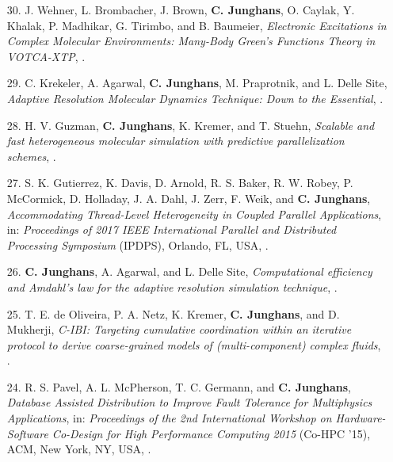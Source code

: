 \documentclass{article}
\begin{document}
\begin{enumerate}
\item[30.] J. Wehner, L. Brombacher, J. Brown, \textbf{C. Junghans}, O. Caylak, Y. Khalak, P. Madhikar, G. Tirimbo, and B. Baumeier,
  \textit{Electronic Excitations in Complex Molecular Environments: Many-Body Green's Functions Theory in VOTCA-XTP},
  .

\item[29.] C. Krekeler, A. Agarwal, \textbf{C. Junghans}, M. Praprotnik, and L. Delle Site,
  \textit{Adaptive Resolution Molecular Dynamics Technique: Down to the Essential},
  .

\item[28.] H. V. Guzman, \textbf{C. Junghans}, K. Kremer, and T. Stuehn,
  \textit{Scalable and fast heterogeneous molecular simulation with predictive parallelization schemes},
  .

\item[27.] S. K. Gutierrez, K. Davis, D. Arnold, R. S. Baker, R. W. Robey, P. McCormick, D. Holladay, J. A. Dahl, J. Zerr, F. Weik, and \textbf{C. Junghans},
  \textit{Accommodating Thread-Level Heterogeneity in Coupled Parallel Applications},
  in: \textit{Proceedings of 2017 IEEE International Parallel and Distributed Processing Symposium} (IPDPS),
  Orlando, FL, USA, .

\item[26.] \textbf{C. Junghans}, A. Agarwal, and L. Delle Site,
  \textit{Computational efficiency and Amdahl’s law for the adaptive resolution simulation technique},
  .

\item[25.] T. E. de Oliveira, P. A. Netz, K. Kremer, \textbf{C. Junghans}, and D. Mukherji,
  \textit{C-IBI: Targeting cumulative coordination within an iterative protocol to derive coarse-grained models of (multi-component) complex fluids},
  .

\item[24.] R. S. Pavel, A. L. McPherson, T. C. Germann, and \textbf{C. Junghans},
  \textit{Database Assisted Distribution to Improve Fault Tolerance for Multiphysics Applications},
  in: \textit{Proceedings of the 2nd International Workshop on Hardware-Software Co-Design for High Performance Computing 2015} (Co-HPC '15),
  ACM, New York, NY, USA, .


\end{enumerate}
\end{document}
